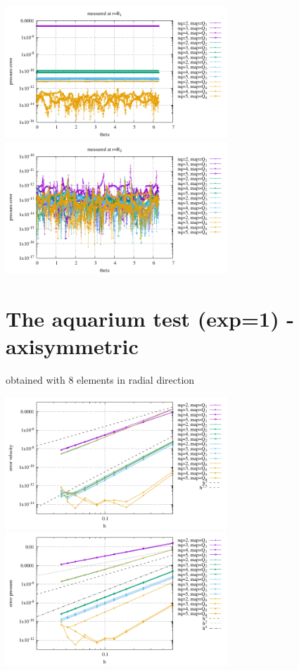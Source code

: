 \begin{center}
\includegraphics[width=8.3cm]{python_codes/fieldstone_152/results/exp1/qqq_R1}
\includegraphics[width=8.3cm]{python_codes/fieldstone_152/results/exp1/qqq_R2}
\end{center}


\newpage
\section*{The aquarium test (exp=1) - axisymmetric}

obtained with 8 elements in radial direction

\begin{center}
\includegraphics[width=8.3cm]{python_codes/fieldstone_152/results/exp1_axisymmetric/errv}
\includegraphics[width=8.3cm]{python_codes/fieldstone_152/results/exp1_axisymmetric/errp}
\end{center}


